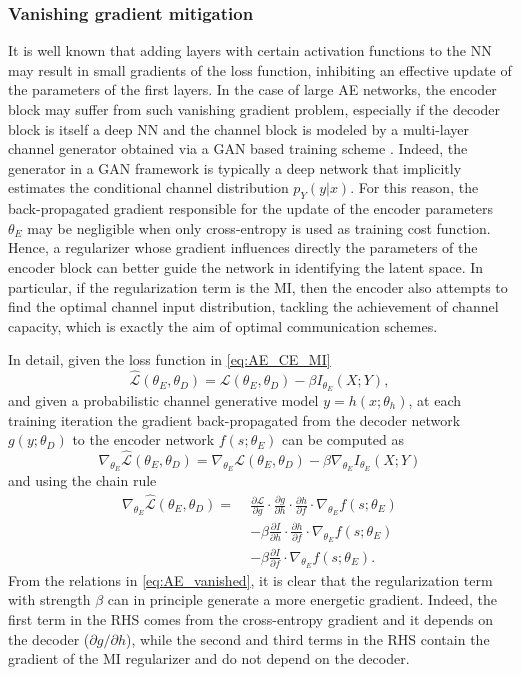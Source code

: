 \subsubsection{Vanishing gradient mitigation}
\label{subsec:autoencoders_vanishing}
It is well known that adding layers with certain activation functions to the NN may result in small gradients of the loss function, inhibiting an effective update of the parameters of the first layers. In the case of large AE networks, the encoder block may suffer from such vanishing gradient problem, especially if the decoder block is itself a deep NN and the channel block is modeled by a multi-layer channel generator obtained via a GAN based training scheme \cite{OsheaGAN}.
Indeed, the generator in a GAN framework is typically a deep network that implicitly estimates the conditional channel distribution $p_Y(y|x)$. For this reason, the back-propagated gradient responsible for the update of the encoder parameters $\theta_E$ may be negligible when only cross-entropy is used as training cost function. Hence, a regularizer whose gradient influences directly the parameters of the encoder block can better guide the network in identifying the latent space. In particular, if the regularization term is the MI, then the encoder also attempts to find the optimal channel input distribution, tackling the achievement of channel capacity, which is exactly the aim of optimal communication schemes.

In detail, given the loss function in \eqref{eq:AE_CE_MI}
\begin{equation}
\hat{\mathcal{L}}(\theta_E, \theta_D) = \mathcal{L}(\theta_E, \theta_D) - \beta I_{\theta_E}(X;Y),
\end{equation}
and given a probabilistic channel generative model $y=h(x; \theta_h)$,
at each training iteration the gradient back-propagated from the decoder network $g(y;\theta_D)$ to the encoder network $f(s;\theta_E)$ can be computed as
\begin{equation}
\nabla_{\theta_E}\hat{\mathcal{L}}(\theta_E, \theta_D) = \nabla_{\theta_E} \mathcal{L}(\theta_E, \theta_D) - \beta \nabla_{\theta_E}I_{\theta_E}(X;Y)
\end{equation}
and using the chain rule
\begin{align}
\label{eq:AE_vanished}
\nabla_{\theta_E}\hat{\mathcal{L}}(\theta_E, \theta_D) = \; & \frac{\partial \mathcal{L}}{\partial g} \cdot \frac{\partial g}{\partial h} \cdot \frac{\partial h}{\partial f} \cdot \nabla_{\theta_E} f(s;\theta_E) \nonumber \\
& - \beta \frac{\partial I}{\partial h} \cdot \frac{\partial h}{\partial f} \cdot \nabla_{\theta_E} f(s;\theta_E) \nonumber \\ 
& - \beta \frac{\partial I}{\partial f} \cdot  \nabla_{\theta_E} f(s;\theta_E).
\end{align}
From the relations in \eqref{eq:AE_vanished}, it is clear that the regularization term with strength $\beta$ can in principle generate a more energetic gradient. Indeed, the first term in the RHS comes from the cross-entropy gradient and it depends on the decoder ($\partial g / \partial h$), while the second and third terms in the RHS contain the gradient of the MI regularizer and do not depend on the decoder.

